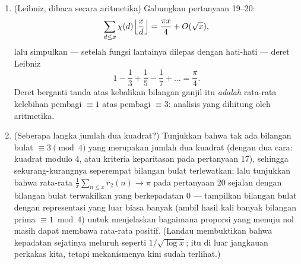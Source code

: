 \begin{problem}
\begin{enumerate}[resume]
{        luasnya, dengan galat yang hidup di dalam cincin selebar
        $O(1)$)}.
  \item (Leibniz, dibaca secara aritmetika) Gabungkan pertanyaan 19--20:
        \[
        \sum_{d \leq x}\chi(d)\Bigl\lfloor\frac
        xd\Bigr\rfloor = \frac{\pi x}4 + O(\sqrt x),
        \]
        lalu simpulkan --- setelah fungsi lantainya dilepas dengan hati-hati ---
        deret Leibniz
        \[
        1 - \frac13 + \frac15 - \frac17 + \dots = \frac\pi4 .
        \]
        Deret berganti tanda atas kebalikan bilangan ganjil itu \emph{adalah}
        rata-rata kelebihan pembagi $\equiv 1$ atas pembagi
        $\equiv 3$: analisis yang dihitung oleh aritmetika.
  \item (Seberapa langka jumlah dua kuadrat?) Tunjukkan bahwa tak ada
        bilangan bulat $\equiv 3 \pmod 4$ yang merupakan jumlah dua kuadrat (dengan dua
        cara: kuadrat modulo $4$, atau kriteria keparitasan pada
        pertanyaan 17), sehingga sekurang-kurangnya seperempat bilangan bulat
        terlewatkan; lalu tunjukkan bahwa rata-rata $\frac1x\sum_{n\leq
        x}r_2(n) \to \pi$ pada pertanyaan 20 sejalan dengan
        bilangan bulat terwakilkan yang berkepadatan $0$ ---
        tampilkan bilangan bulat dengan representasi yang luar biasa banyak
        (ambil hasil kali banyak bilangan prima $\equiv 1 \bmod 4$) untuk
        menjelaskan bagaimana proporsi yang menuju nol masih dapat membawa
        rata-rata positif. (Landau membuktikan bahwa kepadatan sejatinya meluruh
        seperti $1/\sqrt{\log x}$; itu di luar jangkauan perkakas kita, tetapi
        mekanismenya kini sudah terlihat.)
\end{enumerate}


\end{problem}
